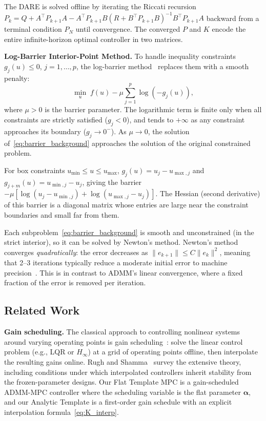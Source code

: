 \documentclass[letterpaper, 10pt, conference]{IEEEtran}
\newcommand{\balpha}{\bm{\alpha}}
\begin{document}
The DARE is solved offline by iterating the Riccati recursion
$P_{k} = Q + A^\top P_{k+1} A - A^\top P_{k+1} B
(R + B^\top P_{k+1} B)^{-1} B^\top P_{k+1} A$
backward from a terminal condition $P_N$ until convergence.
The converged $P$ and $K$ encode the entire infinite-horizon
optimal controller in two matrices.

\textbf{Log-Barrier Interior-Point Method.}
To handle inequality constraints
$g_j(u) \leq 0$, $j = 1, \ldots, p$,
the log-barrier method~\cite{boyd2004} replaces them with
a smooth penalty:
\begin{equation}\label{eq:barrier_background}
  \min_u \; f(u) - \mu \sum_{j=1}^{p} \log(-g_j(u)),
\end{equation}
where $\mu > 0$ is the barrier parameter.
The logarithmic term is finite only when all constraints
are strictly satisfied ($g_j < 0$), and tends to $+\infty$
as any constraint approaches its boundary ($g_j \to 0^-$).
As $\mu \to 0$, the solution of~\eqref{eq:barrier_background}
approaches the solution of the original constrained problem.

For box constraints $u_{\min} \leq u \leq u_{\max}$,
$g_j(u) = u_j - u_{\max,j}$ and
$g_{j+m}(u) = u_{\min,j} - u_j$,
giving the barrier
$-\mu[\log(u_j - u_{\min,j}) + \log(u_{\max,j} - u_j)]$.
The Hessian (second derivative) of this barrier is a
diagonal matrix whose entries are large near the constraint
boundaries and small far from them.

Each subproblem~\eqref{eq:barrier_background} is smooth
and unconstrained (in the strict interior), so it can be
solved by Newton's method.
Newton's method converges \emph{quadratically}:
the error decreases as $\|e_{k+1}\| \leq C \|e_k\|^2$,
meaning that 2--3 iterations typically reduce a moderate
initial error to machine precision~\cite{boyd2004}.
This is in contrast to ADMM's linear
convergence, where a fixed fraction of the error is removed
per iteration.

\subsection{Related Work}\label{sec:related}

\textbf{Gain scheduling.}
The classical approach to controlling nonlinear systems around
varying operating points is gain scheduling~\cite{rugh2000}:
solve the linear control problem (e.g., LQR or $H_\infty$) at
a grid of operating points offline, then interpolate the resulting
gains online.
Rugh and Shamma~\cite{rugh2000} survey the extensive theory,
including conditions under which interpolated controllers
inherit stability from the frozen-parameter designs.
Our Flat Template MPC is a gain-scheduled ADMM-MPC controller
where the scheduling variable is the flat parameter $\balpha$,
and our Analytic Template is a first-order gain schedule with
an explicit interpolation formula~\eqref{eq:K_interp}.
\end{document}
